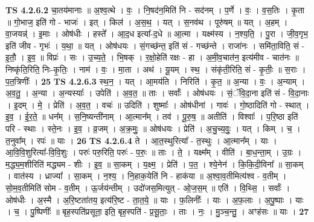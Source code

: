 \documentclass[17pt]{extarticle}
\begin{document}
                  \newline
                                \textbf{ TS 4.2.6.2} \newline
                  चा॒तय॑मानाः ॥ अ॒श्व॒त्थे । वः॒ । नि॒षद॑न॒मिति॑ नि - सद॑नम् । प॒र्णे । वः॒ । व॒स॒तिः । कृ॒ता ॥ गो॒भाज॒ इति॑ गो - भाजः॑ । इत् । किल॑ । अ॒स॒थ॒ । यत् । स॒नव॑थ । पूरु॑षम् ॥ यत् । अ॒हम् । वा॒जयन्न्॑ । इ॒माः । ओष॑धीः । हस्ते᳚ । आ॒द॒ध इत्या᳚-द॒धे ॥ आ॒त्मा । यक्ष्म॑स्य । न॒श्य॒ति॒ । पु॒रा । जी॒व॒गृभ॒ इति॑ जीव - गृभः॑ । य॒था॒ ॥ यत् । ओष॑धयः । सं॒गच्छ॑न्त॒ इति॑ सं - गच्छ॑न्ते । राजा॑नः । समि॑ता॒विति॒ सं - इ॒तौ॒ । इ॒व॒ ॥ विप्रः॑ । सः । उ॒च्य॒ते॒ । भि॒षक् । र॒क्षो॒हेति॑ रक्षः - हा । अ॒मी॒व॒चात॑न॒ इत्य॑मीव - चात॑नः ॥ निष्कृ॑ति॒रिति॒ निः-कृ॒तिः॒ । नाम॑ । वः॒ । मा॒ता । अथ॑ । यू॒यम् । स्थ॒ । संकृ॑ती॒रिति॒ सं - कृ॒तीः॒ ॥ स॒राः । प॒त॒त्रिणीः᳚ । \textbf{  25} \newline
                  \newline
                                \textbf{ TS 4.2.6.3} \newline
                  स्थ॒न॒ । यत् । आ॒मय॑ति । निरिति॑ । कृ॒त॒ ॥ अ॒न्या । वः॒ । अ॒न्याम् । अ॒व॒तु॒ । अ॒न्या । अ॒न्यस्याः᳚ । उपेति॑ । अ॒व॒त॒ ॥ ताः । सर्वाः᳚ । ओष॑धयः । सं॒ॅवि॒दा॒ना इति॑ सं - वि॒दा॒नाः । इ॒दम् । मे॒ । प्रेति॑ । अ॒व॒त॒ । वचः॑ ॥ उदिति॑ । शुष्माः᳚ । ओष॑धीनां । गावः॑ । गो॒ष्ठादिति॑ गो - स्थात् । इ॒व॒ । ई॒र॒ते॒ ॥ धन᳚म् । स॒नि॒ष्यन्ती॑नाम् । आ॒त्मान᳚म् । तव॑ । पू॒रु॒ष॒ ॥ अतीति॑ । विश्वाः᳚ । प॒रि॒ष्ठा इति॑ परि - स्थाः । स्ते॒नः । इ॒व॒ । व्र॒जम् । अ॒क्र॒मुः॒ ॥ ओष॑धयः । प्रेति॑ । अ॒चु॒च्य॒वुः॒ । यत् । किम् । च॒ । त॒नुवा᳚म् । रपः॑ ॥ याः । \textbf{  26} \newline
                  \newline
                                \textbf{ TS 4.2.6.4} \newline
                  ते । आ॒त॒स्थुरित्या᳚ - त॒स्थुः । आ॒त्मान᳚म् । याः । आ॒वि॒वि॒शुरित्या᳚-वि॒वि॒शुः । परुः॑ परु॒रिति॒ परुः॑ - प॒रुः॒ ॥ ताः । ते॒ । यक्ष्म᳚म् । वीति॑ । बा॒ध॒न्ता॒म् । उ॒ग्रः । म॒द्ध्य॒म॒शीरिति॑ मद्ध्यम - शीः । इ॒व॒ ॥ सा॒कम् । य॒क्ष्म॒ । प्रेति॑ । प॒त॒ । श्ये॒नेन॑ । कि॒कि॒दी॒विना᳚ ॥ सा॒कम् । वात॑स्य । ध्राज्या᳚ । सा॒कम् । न॒श्य॒ । नि॒हाक॒येति॑ नि - हाक॑या ॥ अ॒श्वा॒व॒तीमित्य॑श्व - व॒तीम् । सो॒म॒व॒तीमिति॑ सोम - व॒तीम् । ऊ॒र्जय॑न्तीम् । उदो॑जस॒मित्युत् - ओ॒ज॒स॒म् ॥ एति॑ । वि॒थ्सि॒ । सर्वाः᳚ । ओष॑धीः । अ॒स्मै । अ॒रि॒ष्टता॑तय॒ इत्य॑रि॒ष्ट - ता॒त॒ये॒ ॥ याः । फ॒लिनीः᳚ । याः । अ॒फ॒लाः । अ॒पु॒ष्पाः । याः । च॒ । पु॒ष्पिणीः᳚ ॥ बृह॒स्पति॑प्रसूता॒ इति॒ बृह॒स्पति॑ - प्र॒सू॒ताः॒ । ताः । नः॒ । मु॒ञ्च॒न्तु॒ । अꣳह॑सः ॥ याः । \textbf{  27} \newline
\end{document}
